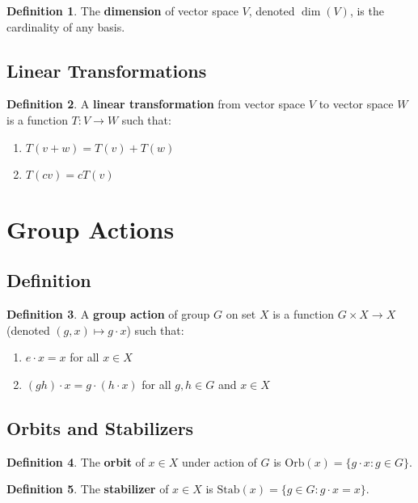 \documentclass[11pt]{article}
\theoremstyle{definition}
\newtheorem{definition}{Definition}[section]
\begin{document}
\begin{definition}
The \textbf{dimension} of vector space $V$, denoted $\dim(V)$, is the cardinality of any basis.
\end{definition}

\subsection{Linear Transformations}
\begin{definition}
A \textbf{linear transformation} from vector space $V$ to vector space $W$ is a function $T: V \to W$ such that:
\begin{enumerate}
    \item $T(v + w) = T(v) + T(w)$
    \item $T(cv) = cT(v)$
\end{enumerate}
\end{definition}

\section{Group Actions}

\subsection{Definition}
\begin{definition}
A \textbf{group action} of group $G$ on set $X$ is a function $G \times X \to X$ (denoted $(g, x) \mapsto g \cdot x$) such that:
\begin{enumerate}
    \item $e \cdot x = x$ for all $x \in X$
    \item $(gh) \cdot x = g \cdot (h \cdot x)$ for all $g, h \in G$ and $x \in X$
\end{enumerate}
\end{definition}

\subsection{Orbits and Stabilizers}
\begin{definition}
The \textbf{orbit} of $x \in X$ under action of $G$ is $\text{Orb}(x) = \{g \cdot x : g \in G\}$.
\end{definition}

\begin{definition}
The \textbf{stabilizer} of $x \in X$ is $\text{Stab}(x) = \{g \in G : g \cdot x = x\}$.
\end{definition}
\end{document}
